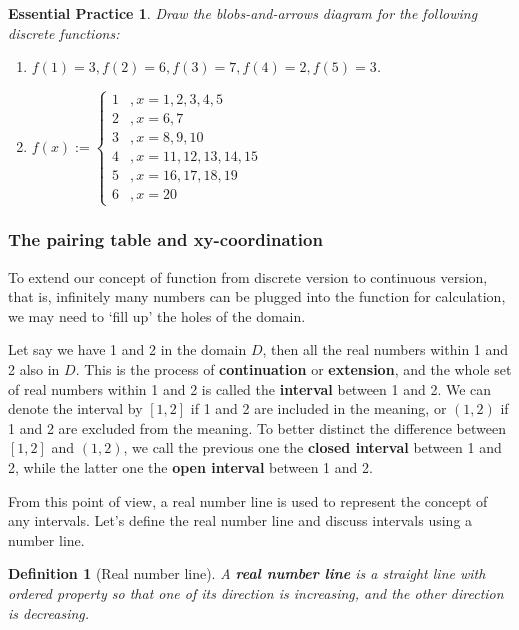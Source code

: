 \documentclass[12pt]{article}
\newtheorem{definition}{Definition}[section]
\newtheorem{exercise}{Essential Practice}[subsection]
\begin{document}
    \begin{exercise}
        Draw the blobs-and-arrows diagram for the following discrete functions:\begin{enumerate}
            \item $f(1)=3, f(2)=6, f(3)=7, f(4)=2, f(5)=3$.
            \item $f(x):=\begin{cases}
                1 &,x=1,2,3,4,5\\
                2 &,x=6,7\\
                3 &,x=8,9,10\\
                4 &,x=11,12,13,14,15\\
                5 &,x=16,17,18,19\\
                6 &,x=20
            \end{cases}$
        \end{enumerate}
    \end{exercise}

    \subsubsection*{The pairing table and xy-coordination}

    To extend our concept of function from discrete version to continuous version, that is, infinitely many numbers can be plugged into the function for calculation, we may need to `fill up' the holes of the domain. 
    
    Let say we have 1 and 2 in the domain $D$, then all the real numbers within 1 and 2 also in $D$. This is the process of \textbf{continuation} or \textbf{extension}, and the whole set of real numbers within 1 and 2 is called the \textbf{interval} between 1 and 2. We can denote the interval by $[1,2]$ if 1 and 2 are included in the meaning, or $(1,2)$ if 1 and 2 are excluded from the meaning. To better distinct the difference between $[1,2]$ and $(1,2)$, we call the previous one the \textbf{closed interval} between 1 and 2, while the latter one the \textbf{open interval} between 1 and 2.

    From this point of view, a real number line is used to represent the concept of any intervals. Let's define the real number line and discuss intervals using a number line.

    \begin{definition}[Real number line]
        A \textbf{real number line} is a straight line with ordered property so that one of its direction is increasing, and the other direction is decreasing.
    \end{definition}
\end{document}
